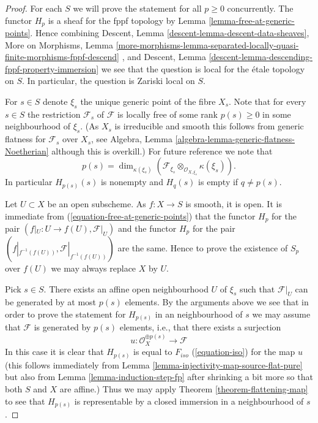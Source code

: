 \documentclass[10pt,a4paper]{amsart}
\theoremstyle{plain}
\theoremstyle{definition}
\theoremstyle{remark}
\numberwithin{equation}{subsection}
\begin{document}
\begin{proof}
For each $S$ we will prove the statement for all $p \geq 0$ concurrently.
The functor $H_p$ is a sheaf for the fppf topology by
Lemma \ref{lemma-free-at-generic-points}.
Hence combining
Descent, Lemma \ref{descent-lemma-descent-data-sheaves},
More on Morphisms, Lemma
\ref{more-morphisms-lemma-separated-locally-quasi-finite-morphisms-fppf-descend}
, and
Descent, Lemma \ref{descent-lemma-descending-fppf-property-immersion}
we see that the question is local for the \'etale topology on $S$.
In particular, the question is Zariski local on $S$.

\medskip\noindent
For $s \in S$ denote $\xi_s$ the unique generic point of the fibre $X_s$.
Note that for every $s \in S$ the restriction $\mathcal{F}_s$ of
$\mathcal{F}$ is locally free of some rank $p(s) \geq 0$ in some
neighbourhood of $\xi_s$. (As $X_s$ is irreducible
and smooth this follows from generic flatness for $\mathcal{F}_s$ over
$X_s$, see
Algebra, Lemma \ref{algebra-lemma-generic-flatness-Noetherian}
although this is overkill.) For future reference we note that
$$
p(s) =
\dim_{\kappa(\xi_s)}(
\mathcal{F}_{\xi_s} \otimes_{\mathcal{O}_{X, \xi_s}} \kappa(\xi_s)
).
$$
In particular $H_{p(s)}(s)$ is nonempty and $H_q(s)$ is empty
if $q \not = p(s)$.

\medskip\noindent
Let $U \subset X$ be an open subscheme.
As $f : X \to S$ is smooth, it is open.
It is immediate from (\ref{equation-free-at-generic-points})
that the functor $H_p$ for the pair $(f|_U : U \to f(U), \mathcal{F}|_U)$
and the functor $H_p$ for the pair
$(f|_{f^{-1}(f(U))}, \mathcal{F}|_{f^{-1}(f(U))})$
are the same. Hence to prove the existence of $S_p$ over $f(U)$ we may
always replace $X$ by $U$.

\medskip\noindent
Pick $s \in S$. There exists an affine open neighbourhood $U$
of $\xi_s$ such that $\mathcal{F}|_U$ can be generated by at most
$p(s)$ elements. By the arguments above we see that in order to prove
the statement for $H_{p(s)}$ in an neighbourhood of $s$ we may assume
that $\mathcal{F}$ is generated by $p(s)$ elements, i.e., that there exists
a surjection
$$
u : \mathcal{O}_X^{\oplus p(s)} \longrightarrow \mathcal{F}
$$
In this case it is clear that $H_{p(s)}$ is equal to $F_{iso}$
(\ref{equation-iso}) for the map $u$ (this follows immediately from
Lemma \ref{lemma-injectivity-map-source-flat-pure}
but also from
Lemma \ref{lemma-induction-step-fp}
after shrinking a bit more so that both $S$ and $X$ are affine.)
Thus we may apply
Theorem \ref{theorem-flattening-map}
to see that $H_{p(s)}$ is representable by a closed immersion in a
neighbourhood of $s$.


\end{proof}
\end{document}
